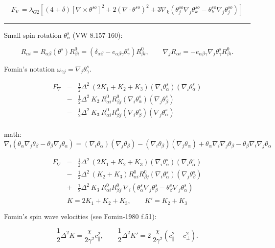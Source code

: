 \documentclass[a4paper]{article}
\begin{document}
$$
F_\nabla = \lambda_{G2} \left[
   (4+\delta) [\nabla \times \theta^{so}]^2
  + 2 (\nabla \cdot \theta^{so})^2
  + 3 \nabla_k(\theta^{so}_j \nabla_j\theta^{so}_k - \theta^{so}_k \nabla_j\theta^{so}_j)
\right]
$$

\eject
\hrule
\medskip

Small spin rotation $\theta^s_\alpha$ (VW 8.157-160):

$$
R_{\alpha i} = R_{\alpha\beta}(\theta^s) R^0_{\beta i} =
(\delta_{\alpha\beta} - e_{\alpha\beta \gamma}\theta^s_\gamma) R^0_{\beta i},
\qquad
\nabla_j R_{\alpha i} = 
- e_{\alpha\beta \gamma}\nabla_j \theta^s_\gamma R^0_{\beta i}.
$$

Fomin's notation $\omega_{\gamma j} = \nabla_j \theta^s_\gamma$.

\begin{eqnarray*}
F_\nabla
&=& \frac12 \Delta^2\ (2 K_1 + K_2 + K_3)
(\nabla_i\theta^s_\alpha) (\nabla_i\theta^s_\alpha)\\
&-& \frac12 \Delta^2\  K_2
\ R^0_{\alpha i}R^0_{\beta j}(\nabla_i\theta^s_\alpha)(\nabla_j\theta^s_\beta)\\
&-& \frac12 \Delta^2\ K_3
\ R^0_{\alpha i}R^0_{\beta j}(\nabla_i\theta^s_\beta) (\nabla_j\theta^s_\alpha)\\
\end{eqnarray*}

math:
$$
\nabla_i(\theta_\alpha \nabla_j\theta_\beta - \theta_\beta \nabla_j\theta_\alpha) =
(\nabla_i\theta_\alpha)(\nabla_j\theta_\beta) -(\nabla_i\theta_\beta) (\nabla_j\theta_\alpha)
+ \theta_\alpha \nabla_i\nabla_j\theta_\beta - \theta_\beta \nabla_i\nabla_j\theta_\alpha
$$

\begin{eqnarray*}
F_\nabla
&=& \frac12 \Delta^2\ (2 K_1 + K_2 + K_3)
(\nabla_i\theta^s_\alpha) (\nabla_i\theta^s_\alpha)\\
&-& \frac12 \Delta^2\ (K_2+K_3)
R^0_{\alpha i}R^0_{\beta j}(\nabla_i\theta^s_\alpha)(\nabla_j\theta^s_\beta)\\
&+& \frac12 \Delta^2\ K_3
\ R^0_{\alpha i}R^0_{\beta j}
\ \nabla_i(\theta^s_\alpha \nabla_j\theta^s_\beta - \theta^s_\beta \nabla_j\theta^s_\alpha)\\
\end{eqnarray*}
$$
K=2K_1+K_2+K_3,\qquad K'=K_2+K_3
$$

Fomin's spin wave velocities (see Fomin-1980 f.51):

$$
\frac12\Delta^2 K  = \frac{\chi}{2\gamma^2} c_\parallel^2,\qquad
\frac12\Delta^2 K' = 2\ \frac{\chi}{2\gamma^2} (c_\parallel^2 - c_\perp^2).
$$
\end{document}
